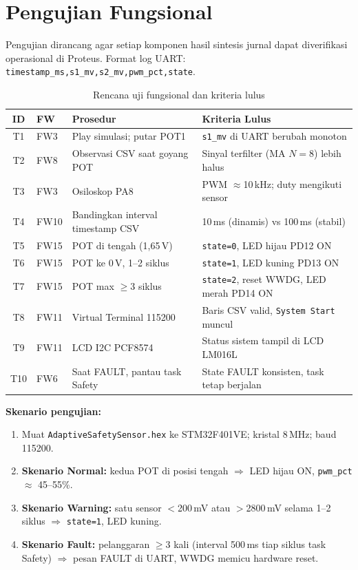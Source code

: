 \documentclass[12pt,a4paper]{article}
\begin{document}
\section{Pengujian Fungsional}

Pengujian dirancang agar setiap komponen hasil sintesis jurnal dapat diverifikasi operasional di Proteus. Format log UART: \texttt{timestamp\_ms,s1\_mv,s2\_mv,pwm\_pct,state}.

\begin{table}[H]
\centering
\caption{Rencana uji fungsional dan kriteria lulus}\label{tab:uji}
\small
\begin{tabular}{@{}clp{3.5cm}p{4.5cm}@{}}
\toprule
\textbf{ID} & \textbf{FW} & \textbf{Prosedur} & \textbf{Kriteria Lulus} \\
\midrule
T1 & FW3  & Play simulasi; putar POT1 & \texttt{s1\_mv} di UART berubah monoton \\
T2 & FW8  & Observasi CSV saat goyang POT & Sinyal terfilter (MA $N{=}8$) lebih halus \\
T3 & FW3  & Osiloskop PA8 & PWM $\approx$10\,kHz; duty mengikuti sensor \\
T4 & FW10 & Bandingkan interval timestamp CSV & 10\,ms (dinamis) vs 100\,ms (stabil) \\
T5 & FW15 & POT di tengah (1,65\,V) & \texttt{state=0}, LED hijau PD12 ON \\
T6 & FW15 & POT ke 0\,V, 1--2 siklus & \texttt{state=1}, LED kuning PD13 ON \\
T7 & FW15 & POT max $\geq$3 siklus & \texttt{state=2}, reset WWDG, LED merah PD14 ON \\
T8 & FW11 & Virtual Terminal 115200 & Baris CSV valid, \texttt{System Start} muncul \\
T9 & FW11 & LCD I2C PCF8574 & Status sistem tampil di LCD LM016L \\
T10 & FW6 & Saat FAULT, pantau task Safety & State FAULT konsisten, task tetap berjalan \\
\bottomrule
\end{tabular}
\end{table}

\textbf{Skenario pengujian:}
\begin{enumerate}
    \item Muat \texttt{AdaptiveSafetySensor.hex} ke STM32F401VE; kristal 8\,MHz; baud 115200.
    \item \textbf{Skenario Normal:} kedua POT di posisi tengah $\Rightarrow$ LED hijau ON, \texttt{pwm\_pct} $\approx$ 45--55\%.
    \item \textbf{Skenario Warning:} satu sensor $<$200\,mV atau $>$2800\,mV selama 1--2 siklus $\Rightarrow$ \texttt{state=1}, LED kuning.
    \item \textbf{Skenario Fault:} pelanggaran $\geq$3 kali (interval 500\,ms tiap siklus task Safety) $\Rightarrow$ pesan FAULT di UART, WWDG memicu hardware reset.
\end{enumerate}
\end{document}
